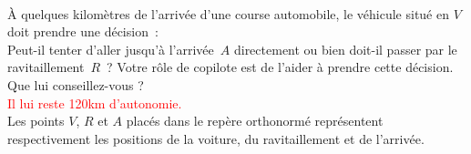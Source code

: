 \documentclass[a4paper,12pt,twocolumn,landscape]{article}
\begin{document}
\begin{minipage}{0.45\textwidth}
\begin{center}
\begin{tikzpicture}[scale=1,every node/.style={scale=1}]
	\end{tikzpicture}
	\\[2em]
	\end{center}
	À quelques kilomètres de l'arrivée d'une course automobile, le véhicule situé en $V$ doit prendre une décision~:\\	
	Peut-il tenter d'aller jusqu'à l'arrivée~$A$ directement ou bien doit-il passer par le ravitaillement~$R$~? Votre rôle de copilote est de l'aider à prendre cette décision.\\ Que lui conseillez-vous ?\\ \textcolor{red}{Il lui reste 120km d'autonomie.}\\
Les points $V$, $R$ et $A$ placés dans le repère orthonormé représentent respectivement les positions de la voiture, du ravitaillement et de l'arrivée.
\vspace{-2em}	

\end{minipage}
\newpage
\end{document}

